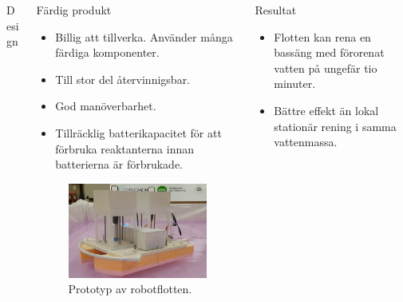 \documentclass[final]{beamer}
\newlength{\onecolwid}
\begin{document}
\begin{frame}[t]
\begin{columns}[t, totalwidth=\textwidth]
\begin{column}{\onecolwid}
\begin{block}{Design}
      \end{block}

    \end{column} %
    \begin{column}{\onecolwid} %

      \begin{block}{Färdig produkt}
        \begin{itemize}
        \item Billig att tillverka. Använder många färdiga komponenter.
        \item Till stor del återvinnigsbar.
        \item God manöverbarhet.
          \item Tillräcklig batterikapacitet för att förbruka reaktanterna innan batterierna är förbrukade.
        \end{itemize}

        \vskip 2cm
        \begin{figure}[H]
          \centering
          \includegraphics[width=\linewidth]{figures/flotte.png}
          \caption{Prototyp av robotflotten.}
        \end{figure}

      \end{block}

    \end{column} %
    \begin{column}{\onecolwid} %

      \begin{block}{Resultat}
        \begin{itemize}
        \item Flotten kan rena en bassäng med förorenat vatten på ungefär tio minuter.
        \item Bättre effekt än lokal stationär rening i samma vattenmassa.
        \end{itemize}


\end{block}
\end{column}
\end{columns}
\end{frame}
\end{document}
